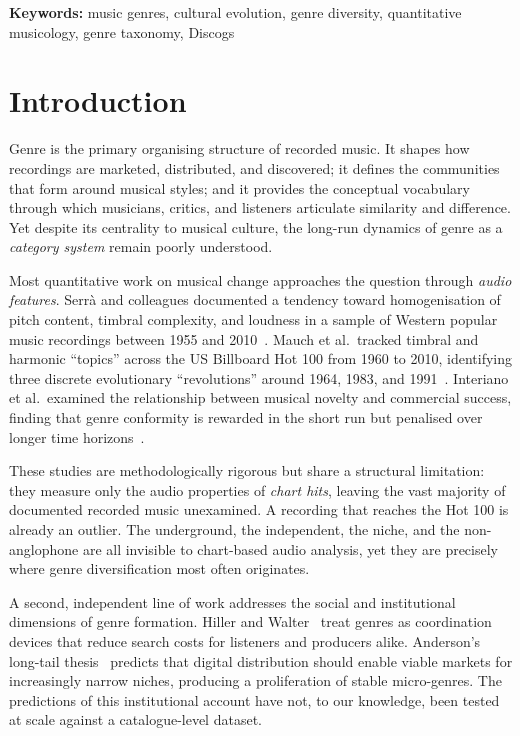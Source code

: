 \documentclass[12pt, a4paper]{article}
\begin{document}
\vspace{0.5em}
\noindent\textbf{Keywords:} music genres, cultural evolution, genre diversity,
quantitative musicology, genre taxonomy, Discogs

\newpage

\section{Introduction}

Genre is the primary organising structure of recorded music.
It shapes how recordings are marketed, distributed, and discovered;
it defines the communities that form around musical styles;
and it provides the conceptual vocabulary through which musicians,
critics, and listeners articulate similarity and difference.
Yet despite its centrality to musical culture, the long-run dynamics of
genre as a \emph{category system} remain poorly understood.

Most quantitative work on musical change approaches the question through
\emph{audio features}. Serr\`{a} and colleagues documented a tendency toward
homogenisation of pitch content, timbral complexity, and loudness in a sample
of Western popular music recordings between 1955 and 2010~\citep{serra2012measuring}.
Mauch et al.\ tracked timbral and harmonic ``topics'' across the US Billboard
Hot 100 from 1960 to 2010, identifying three discrete evolutionary
``revolutions'' around 1964, 1983, and 1991~\citep{mauch2015evolution}.
Interiano et al.\ examined the relationship between musical novelty and
commercial success, finding that genre conformity is rewarded in the short
run but penalised over longer time horizons~\citep{interiano2018musical}.

These studies are methodologically rigorous but share a structural
limitation: they measure only the audio properties of \emph{chart hits},
leaving the vast majority of documented recorded music unexamined.
A recording that reaches the Hot 100 is already an outlier.
The underground, the independent, the niche, and the non-anglophone are
all invisible to chart-based audio analysis, yet they are precisely where
genre diversification most often originates.

A second, independent line of work addresses the social and institutional
dimensions of genre formation. Hiller and Walter~\citep{hiller2018music}
treat genres as coordination devices that reduce search costs for listeners
and producers alike. Anderson's long-tail thesis~\citep{anderson2006long}
predicts that digital distribution should enable viable markets for
increasingly narrow niches, producing a proliferation of stable micro-genres.
The predictions of this institutional account have not, to our knowledge,
been tested at scale against a catalogue-level dataset.
\end{document}
